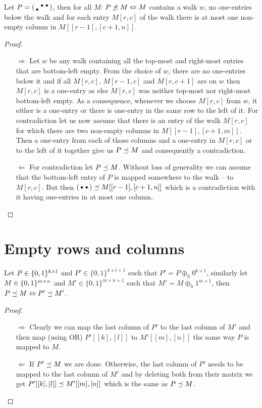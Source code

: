 \begin{thm}
Let $P=\left(\begin{smallmatrix} &\bullet&\bullet\\\bullet& & \end{smallmatrix}\right)$, then for all $M$: $P\not\preceq M\Leftrightarrow M$ contains a walk $w$, no one-entries below the walk and for each entry $M[r,c]$ of the walk there is at most one non-empty column in $M[[r-1],[c+1,n]]$.
\end{thm}
\begin{proof}
\begin{itemize}
\item[$\Rightarrow$] Let $w$ be any walk containing all the top-most and right-most entries that are bottom-left empty. From the choice of $w$, there are no one-entries below it and if all $M[r,c]$, $M[r-1,c]$ and $M[r,c+1]$ are on $w$ then $M[r,c]$ is a one-entry as else $M[r,c]$ was neither top-most nor right-most bottom-left empty. As a consequence, whenever we choose $M[r,c]$ from $w$, it either is a one-entry or there is one-entry in the same row to the left of it. For contradiction let us now assume that there is an entry of the walk $M[r,c]$ for which there are two non-empty columns in $M[[r-1],[c+1,m]]$. Then a one-entry from each of those columns and a one-entry in $M[r,c]$ or to the left of it together give us $P\preceq M$ and consequently a contradiction. 
\item[$\Leftarrow$] For contradiction let $P\preceq M$. Without loss of generality we can assume that the bottom-left entry of $P$ is mapped somewhere to the walk -- to $M[r,c]$. But then $\left(\begin{smallmatrix}\bullet&\bullet\end{smallmatrix}\right)\preceq M[[r-1],[c+1,n]]$ which is a contradiction with it having one-entries in at most one column.
\end{itemize}
\end{proof}

\section{Empty rows and columns}

\begin{obs}
\label{emptyrows}
Let $P\in\{0,1\}^{k\times l}$ and $P'\in\{0,1\}^{k\times l+1}$ such that $P'=P\oplus_h0^{k\times1}$, similarly let $M\in\{0,1\}^{m\times n}$ and $M'\in\{0,1\}^{m\times n+1}$ such that $M'=M\oplus_h1^{m\times1}$, then $P\preceq M\Leftrightarrow P'\preceq M'$.
\end{obs}
\begin{proof}
\begin{itemize}
\item[$\Rightarrow$] Clearly we can map the last column of $P'$ to the last column of $M'$ and then map (using OR) $P'[[k],[l]]$ to $M'[[m],[n]]$ the same way $P$ is mapped to $M$.
\item[$\Leftarrow$] If $P'\preceq M$ we are done. Otherwise, the last column of $P'$ needs to be mapped to the last column of $M'$ and by deleting both from their matrix we get $P'[[k],[l]]\preceq M'[[m],[n]]$ which is the same as $P\preceq M$.
\end{itemize}
\end{proof}

